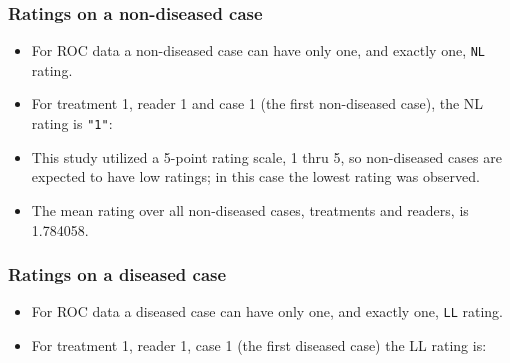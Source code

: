 \documentclass[]{book}
\newenvironment{Shaded}{\begin{snugshade}}{\end{snugshade}}
\newcommand{\CommentTok}[1]{\textcolor[rgb]{0.56,0.35,0.01}{\textit{#1}}}
\newcommand{\DecValTok}[1]{\textcolor[rgb]{0.00,0.00,0.81}{#1}}
\newcommand{\KeywordTok}[1]{\textcolor[rgb]{0.13,0.29,0.53}{\textbf{#1}}}
\newcommand{\NormalTok}[1]{#1}
\newcommand{\OperatorTok}[1]{\textcolor[rgb]{0.81,0.36,0.00}{\textbf{#1}}}
\providecommand{\tightlist}{%
  \setlength{\itemsep}{0pt}\setlength{\parskip}{0pt}}
\begin{document}
\hypertarget{ratings-on-a-non-diseased-case}{%
\subsubsection{Ratings on a non-diseased case}\label{ratings-on-a-non-diseased-case}}

\begin{itemize}
\tightlist
\item
  For ROC data a non-diseased case can have only one, and exactly one, \texttt{NL} rating.
\item
  For treatment 1, reader 1 and case 1 (the first non-diseased case), the NL rating is \texttt{"1"}:
\end{itemize}

\begin{Shaded}
\end{Shaded}

\begin{itemize}
\tightlist
\item
  This study utilized a 5-point rating scale, 1 thru 5, so non-diseased cases are expected to have low ratings; in this case the lowest rating was observed.
\item
  The mean rating over all non-diseased cases, treatments and readers, is 1.784058.
\end{itemize}

\hypertarget{ratings-on-a-diseased-case}{%
\subsubsection{Ratings on a diseased case}\label{ratings-on-a-diseased-case}}

\begin{itemize}
\tightlist
\item
  For ROC data a diseased case can have only one, and exactly one, \texttt{LL} rating.
\item
  For treatment 1, reader 1, case 1 (the first diseased case) the LL rating is:
\end{itemize}
\end{document}
